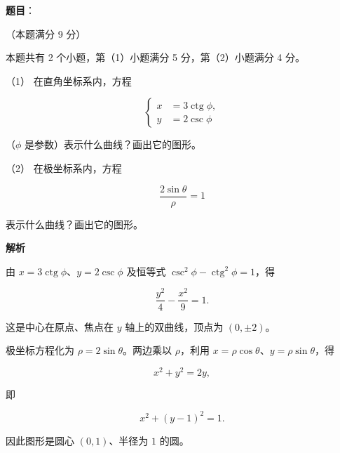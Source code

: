 \begin{answer}

\textbf{题目}：

（本题满分 9 分）

本题共有 2 个小题，第（1）小题满分 5 分，第（2）小题满分 4 分。

（1） 在直角坐标系内，方程

\nopagebreak[4]
\[
\left\{\begin{aligned}
x&=3\operatorname{ctg}\phi,\\
y&=2\operatorname{csc}\phi
\end{aligned}\right.
\]

（$\phi$ 是参数）表示什么曲线？画出它的图形。

（2） 在极坐标系内，方程

\nopagebreak[4]
\[
\frac{2\sin\theta}{\rho}=1
\]

表示什么曲线？画出它的图形。
\nopagebreak[4]
\begin{center}\end{center}
\nopagebreak[4]
\textbf{解析}


由 $x=3\operatorname{ctg}\phi$、$y=2\operatorname{csc}\phi$ 及恒等式 $\operatorname{csc}^2\phi-\operatorname{ctg}^2\phi=1$，得

\nopagebreak[4]
\[
\frac{y^2}{4}-\frac{x^2}{9}=1.
\]

这是中心在原点、焦点在 $y$ 轴上的双曲线，顶点为 $(0,\pm2)$。


极坐标方程化为 $\rho=2\sin\theta$。两边乘以 $\rho$，利用 $x=\rho\cos\theta$、$y=\rho\sin\theta$，得

\nopagebreak[4]
\[
x^2+y^2=2y,
\]

即

\nopagebreak[4]
\[
x^2+(y-1)^2=1.
\]

因此图形是圆心 $(0,1)$、半径为 $1$ 的圆。



\end{answer}
